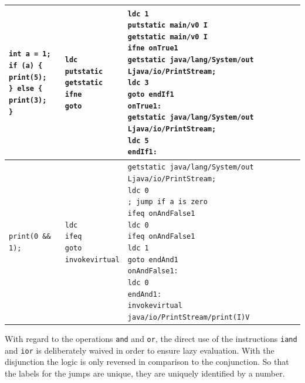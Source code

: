 \begin{table}[bth!]
\begin{tabular}{|l|l|l|}
		\makecell[l]{\texttt{int a = 1;} \\ \texttt{if (a) \{} \\ \quad\texttt{print(5);} \\ \texttt{\} else \{} \\ \quad\texttt{print(3);} \\ \texttt{\}}} & \makecell[l]{\texttt{ldc} \\ \texttt{putstatic} \\ \texttt{getstatic} \\ \texttt{ifne} \\ \texttt{goto}} & \makecell[l]{\texttt{ldc 1} \\ \texttt{putstatic main/v0 I} \\ \texttt{getstatic main/v0 I} \\ \texttt{ifne onTrue1} \\ \texttt{getstatic java/lang/System/out Ljava/io/PrintStream;} \\ \texttt{ldc 3} \\ \texttt{goto endIf1} \\ \texttt{onTrue1:} \\ \texttt{getstatic java/lang/System/out Ljava/io/PrintStream;} \\ \texttt{ldc 5} \\ \texttt{endIf1:}} \\ \hline
		\texttt{print(0 \&\& 1);} & \makecell[l]{\texttt{ldc} \\ \texttt{ifeq} \\ \texttt{goto} \\ \texttt{invokevirtual}} & \makecell[l]{\texttt{getstatic java/lang/System/out Ljava/io/PrintStream;} \\ \texttt{ldc 0} \\ \texttt{; jump if a is zero} \\ \texttt{ifeq onAndFalse1} \\ \texttt{ldc 0} \\ \texttt{ifeq onAndFalse1} \\ \texttt{ldc 1} \\ \texttt{goto endAnd1} \\ \texttt{onAndFalse1:} \\ \texttt{ldc 0} \\ \texttt{endAnd1:} \\ \texttt{invokevirtual java/io/PrintStream/print(I)V}} \\ \hline
	\end{tabular}
\end{table}
\noindent
With regard to the operations \texttt{and} and \texttt{or}, the direct use of the instructions \texttt{iand} and \texttt{ior} is deliberately waived in order to ensure lazy evaluation. With the disjunction the logic is only reversed in comparison to the conjunction. So that the labels for the jumps are unique, they are uniquely identified by a number.


